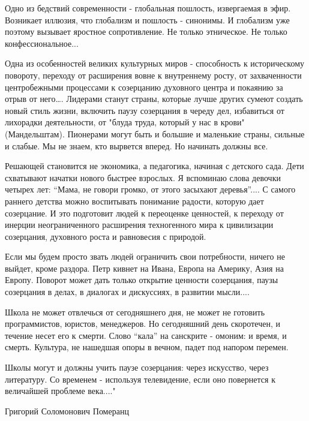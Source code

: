 Одно из бедствий современности - глобальная пошлость, извергаемая в эфир.
Возникает иллюзия, что глобализм и пошлость - синонимы. И глобализм уже
поэтому вызывает яростное сопротивление. Не только этническое. Не только
конфессиональное...

Одна из особенностей великих культурных миров - способность к историческому
повороту, переходу от расширения вовне к внутреннему росту, от
захваченности центробежными процессами к созерцанию духовного центра и
покаянию за отрыв от него…. Лидерами станут страны, которые лучше других
сумеют создать новый стиль жизни, включить паузу созерцания в череду дел,
избавиться от лихорадки деятельности, от "блуда труда, который у нас в
крови" (Мандельштам). Пионерами могут быть и большие и маленькие страны,
сильные и слабые. Мы не знаем, кто вырвется вперед. Но начинать должны все.

Решающей становится не экономика, а педагогика, начиная с детского сада.
Дети схватывают начатки нового быстрее взрослых. Я вспоминаю слова девочки
четырех лет: \enquote{Мама, не говори громко, от этого засыхают деревья}.... С
самого раннего детства можно воспитывать понимание радости, которую дает
созерцание. И это подготовит людей к переоценке ценностей, к переходу от
инерции неограниченного расширения техногенного мира к цивилизации
созерцания, духовного роста и равновесия с природой.

Если мы будем просто звать людей ограничить свои потребности, ничего не
выйдет, кроме раздора. Петр кивнет на Ивана, Европа на Америку, Азия на
Европу. Поворот может дать только открытие ценности созерцания, паузы
созерцания в делах, в диалогах и дискуссиях, в развитии мысли....

Школа не может отвлечься от сегодняшнего дня, не может не готовить
программистов, юристов, менеджеров. Но сегодняшний день скоротечен, и
течение несет его к смерти. Слово \enquote{кала} на санскрите - омоним: и время, и
смерть. Культура, не нашедшая опоры в вечном, падет под напором перемен.

Школы могут и должны учить паузе созерцания: через искусство, через
литературу. Со временем - используя телевидение, если оно повернется к
величайшей проблеме века...."

Григорий Соломонович Померанц

